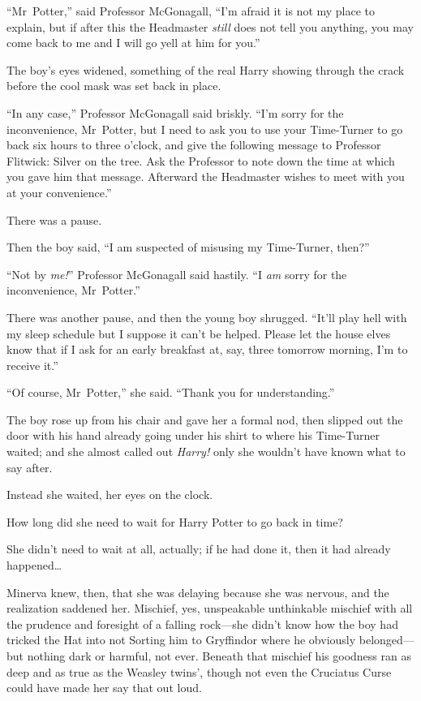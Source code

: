 “Mr~Potter,” said Professor McGonagall, “I’m afraid it is not my place to explain, but if after this the Headmaster \emph{still} does not tell you anything, you may come back to me and I will go yell at him for you.”

The boy’s eyes widened, something of the real Harry showing through the crack before the cool mask was set back in place.

“In any case,” Professor McGonagall said briskly. “I’m sorry for the inconvenience, Mr~Potter, but I need to ask you to use your Time-Turner to go back six hours to three o’clock, and give the following message to Professor Flitwick: Silver on the tree. Ask the Professor to note down the time at which you gave him that message. Afterward the Headmaster wishes to meet with you at your convenience.”

There was a pause.

Then the boy said, “I am suspected of misusing my Time-Turner, then?”

“Not by \emph{me!}” Professor McGonagall said hastily. “I \emph{am} sorry for the inconvenience, Mr~Potter.”

There was another pause, and then the young boy shrugged. “It’ll play hell with my sleep schedule but I suppose it can’t be helped. Please let the house elves know that if I ask for an early breakfast at, say, three \AM tomorrow morning, I’m to receive it.”

“Of course, Mr~Potter,” she said. “Thank you for understanding.”

The boy rose up from his chair and gave her a formal nod, then slipped out the door with his hand already going under his shirt to where his Time-Turner waited; and she almost called out \emph{Harry!} only she wouldn’t have known what to say after.

Instead she waited, her eyes on the clock.

How long did she need to wait for Harry Potter to go back in time?

She didn’t need to wait at all, actually; if he had done it, then it had already happened…

Minerva knew, then, that she was delaying because she was nervous, and the realization saddened her. Mischief, yes, unspeakable unthinkable mischief with all the prudence and foresight of a falling rock—she didn’t know how the boy had tricked the Hat into not Sorting him to Gryffindor where he obviously belonged—but nothing dark or harmful, not ever. Beneath that mischief his goodness ran as deep and as true as the Weasley twins’, though not even the Cruciatus Curse could have made her say that out loud.

